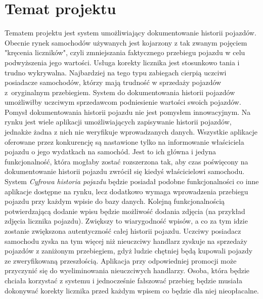 \documentclass[12pt]{article}
\begin{document}
\section{Temat projektu}

Tematem projektu jest system umożliwiający dokumentowanie historii pojazdów. Obecnie rynek samochodów używanych jest kojarzony z tak zwanym pojęciem "kręcenia liczników", czyli zmniejszania faktycznego przebiegu pojazdu w celu podwyższenia jego wartości. Usługa korekty licznika jest stosunkowo tania i trudno wykrywalna. Najbardziej na tego typu zabiegach cierpią uczciwi posiadacze samochodów, którzy mają trudność w sprzedaży pojazdów z~oryginalnym przebiegiem. System do dokumentowania historii pojazdów umożliwiłby uczciwym sprzedawcom podniesienie wartości swoich pojazdów. \\

Pomysł dokumentowania historii pojazdu nie jest pomysłem innowacyjnym. Na rynku jest wiele aplikacji umożliwiających zapisywanie historii pojazdów, jednakże żadna z nich nie weryfikuje wprowadzanych danych. Wszystkie aplikacje oferowane przez konkurencję są nastawione tylko na informowanie właściciela pojazdu o jego wydatkach na samochód. Jest to ich główna i jedyna funkcjonalność, która mogłaby zostać rozszerzona tak, aby czas poświęcony na dokumentowanie historii pojazdu zwrócił się kiedyś właścicielowi samochodu.\\

System\textit{ Cyfrowa historia pojazdu} będzie posiadał podobne funkcjonalności co inne aplikacje dostępne na rynku, lecz dodatkowo wymaga wprowadzenia przebiegu pojazdu przy każdym wpisie do bazy danych. Kolejną funkcjonalnością potwierdzającą dodanie wpisu będzie możliwość dodania zdjęcia (na przykład zdjęcia licznika pojazdu). Zwiększy to wiarygodność wpisów, a co za tym idzie zostanie zwiększona autentyczność całej historii pojazdu. Uczciwy posiadacz samochodu zyska na tym więcej niż nieuczciwy handlarz zyskuje na sprzedaży pojazdów z zaniżonym przebiegiem, gdyż ludzie chętniej będą kupowali pojazdy ze zweryfikowaną przeszłością. Aplikacja przy odpowiedniej promocji może przyczynić się do wyeliminowania nieuczciwych handlarzy. Osoba, która będzie chciała korzystać z systemu i jednocześnie fałszować przebieg będzie musiała dokonywać korekty licznika przed każdym wpisem co będzie dla niej nieopłacalne. 
\end{document}
